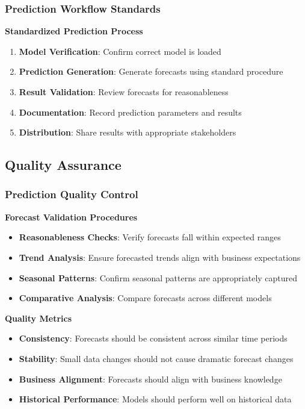 \subsubsection{Prediction Workflow Standards}

\textbf{Standardized Prediction Process}
\begin{enumerate}
	\item \textbf{Model Verification}: Confirm correct model is loaded
	\item \textbf{Prediction Generation}: Generate forecasts using standard procedure
	\item \textbf{Result Validation}: Review forecasts for reasonableness
	\item \textbf{Documentation}: Record prediction parameters and results
	\item \textbf{Distribution}: Share results with appropriate stakeholders
\end{enumerate}



\subsection{Quality Assurance}

\subsubsection{Prediction Quality Control}

\textbf{Forecast Validation Procedures}
\begin{itemize}
	\item \textbf{Reasonableness Checks}: Verify forecasts fall within expected ranges
	\item \textbf{Trend Analysis}: Ensure forecasted trends align with business expectations
	\item \textbf{Seasonal Patterns}: Confirm seasonal patterns are appropriately captured
	\item \textbf{Comparative Analysis}: Compare forecasts across different models
\end{itemize}

\textbf{Quality Metrics}
\begin{itemize}
	\item \textbf{Consistency}: Forecasts should be consistent across similar time periods
	\item \textbf{Stability}: Small data changes should not cause dramatic forecast changes
	\item \textbf{Business Alignment}: Forecasts should align with business knowledge
	\item \textbf{Historical Performance}: Models should perform well on historical data
\end{itemize}

